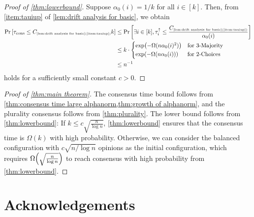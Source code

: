 \documentclass[letterpaper,11pt]{article}
\newcommand{\constrefs}[2]{C_{\mbox{\tiny\ref{#1}(\ref{#2})}}}
\newcommand{\taucons}{\tau_{\mathrm{cons}}}
\newcommand{\alphanorm}{\gamma}
\newcommand{\tauiup}{\tau^{\uparrow}_i}
\newcommand{\taujweak}{\tau^{\mathrm{weak}}_j}
\begin{document}
\begin{proof}[Proof of \cref{thm:lowerbound}]
  Suppose $\alpha_0(i)=1/k$ for all $i\in [k]$.
  Then, from \cref{item:tauiup} of \cref{lem:drift analysis for basic}, we obtain
  \begin{align*}
    \Pr\qty[\taucons \leq  \constrefs{lem:drift analysis for basic}{item:tauiup} k]
    &\leq \Pr\qty[\exists i\in [k], \tauiup \leq  \frac{\constrefs{lem:drift analysis for basic}{item:tauiup}}{\alpha_0(i)} ]\\
    &\leq k \cdot
    \begin{cases*}
      \exp(-\Omega(n\alpha_0(i)^2)) &\text{for 3-Majority} \\
      \exp(-\Omega(n\alpha_0(i))) &\text{for 2-Choices} \\
    \end{cases*}\\
    &\leq n^{-1}
  \end{align*}
  holds for a sufficiently small constant $c>0$.
\end{proof}

\begin{proof}[Proof of \cref{thm:main theorem}]
  The consensus time bound follows from \cref{thm:consensus time large alphanorm,thm:growth of alphanorm}, and the plurality consensus follows from \cref{thm:plurality}.
  The lower bound follows from \cref{thm:lowerbound}:
  If $k\le c\sqrt{\frac{n}{\log n}}$, \cref{thm:lowerbound} ensures that the consensus time is $\Omega(k)$ with high probability.
  Otherwise, we can consider the balanced configuration with $c\sqrt{n/\log n}$ opinions as the initial configuration, which requires $\Omega\qty(\sqrt{\frac{n}{\log n}})$ to reach consensus with high probability from \cref{thm:lowerbound}.
\end{proof}

\section*{Acknowledgements}
\end{document}
